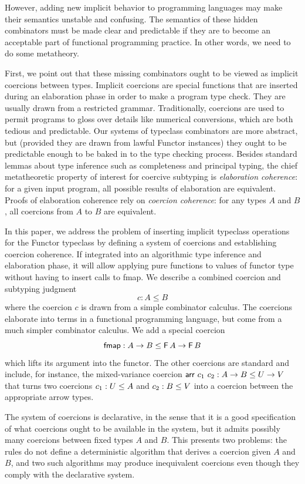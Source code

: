 \documentclass[acmsmall,screen]{acmart}
\begin{document}
However, adding new implicit behavior to programming languages may make their
semantics unstable and confusing. The semantics of these hidden combinators must
be made clear and predictable if they are to become an acceptable part of
functional programming practice. In other words, we need to do some metatheory.

First, we point out that these missing combinators ought to be viewed as
implicit coercions between types. Implicit coercions are special functions
that are inserted during an elaboration phase in order to make a program type
check. They are usually drawn from a restricted grammar. Traditionally,
coercions are used to permit programs to gloss over details like
numerical conversions, which are both tedious and predictable. Our systems of
typeclass combinators are more abstract, but (provided they are drawn from
lawful Functor instances) they ought to be predictable enough to be baked in to
the type checking process. Besides standard lemmas about type inference such as
completeness and principal typing, the chief metatheoretic property of interest
for coercive subtyping is \emph{elaboration coherence}: for a given input
program, all possible results of elaboration are equivalent.
Proofs of elaboration coherence rely on \emph{coercion coherence}: for any
types \(A\) and \(B\), all coercions from \(A\) to \(B\) are equivalent.

In this paper, we address the problem of inserting implicit typeclass operations
for the Functor typeclass by defining a system of coercions and establishing
coercion coherence.  If integrated into an algorithmic type inference and
elaboration phase, it will allow applying pure functions to values of functor
type without having to insert calls to fmap. We describe a combined coercion and
subtyping judgment \[
  c : A \leq B
\]
where the coercion \(c\) is drawn from a simple combinator calculus. The
coercions elaborate into terms in a functional programming language, but come
from a much simpler combinator calculus. We add a special coercion \[
  \mathsf{fmap} : A \to B \leq \mathsf{F}\, A \to \mathsf{F}\, B
\]
which lifts its argument into the functor. The other coercions are standard and
include, for instance, the mixed-variance coercion \(\mathsf{arr}\ c_1\ c_2 : A \to
B \leq U \to V\) that turns two coercions \(c_1 : U \leq A\) and \(c_2
: B \leq V\) into a coercion between the appropriate arrow types.

The system of coercions is declarative, in the sense that it is a good
specification of what coercions ought to be available in the system, but it
admits possibly many coercions between fixed types \(A\) and \(B\).
This presents two problems: the rules do not define a deterministic algorithm
that derives a coercion given \(A\) and \(B\), and two such algorithms may
produce inequivalent coercions even though they comply with the declarative
system.
\end{document}
